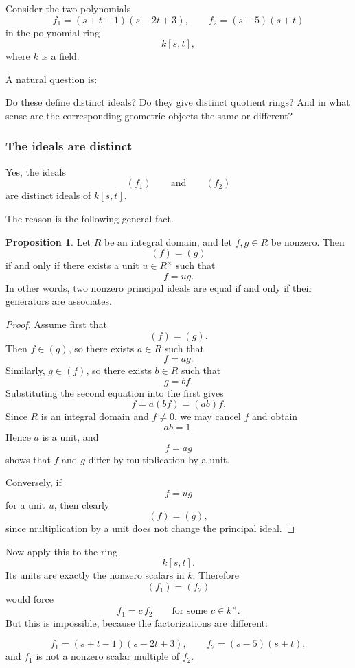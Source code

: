 \documentclass[12pt,a4paper]{article}
\theoremstyle{notespace}
\theoremstyle{definition}
\newtheorem{proposition}[definition]{Proposition}
\begin{document}
Consider the two polynomials
\[
f_1=(s+t-1)(s-2t+3),
\qquad
f_2=(s-5)(s+t)
\]
in the polynomial ring
\[
k[s,t],
\]
where \(k\) is a field.

A natural question is:

\medskip

Do these define distinct ideals?
Do they give distinct quotient rings?
And in what sense are the corresponding geometric objects the same or different?

\subsubsection{The ideals are distinct}

Yes, the ideals
\[
(f_1)
\qquad\text{and}\qquad
(f_2)
\]
are distinct ideals of \(k[s,t]\).

The reason is the following general fact.

\begin{proposition}
	Let \(R\) be an integral domain, and let \(f,g\in R\) be nonzero. Then
	\[
	(f)=(g)
	\]
	if and only if there exists a unit \(u\in R^\times\) such that
	\[
	f=ug.
	\]
	In other words, two nonzero principal ideals are equal if and only if their generators are associates.
\end{proposition}

\begin{proof}
	Assume first that
	\[
	(f)=(g).
	\]
	Then \(f\in (g)\), so there exists \(a\in R\) such that
	\[
	f=ag.
	\]
	Similarly, \(g\in (f)\), so there exists \(b\in R\) such that
	\[
	g=bf.
	\]
	Substituting the second equation into the first gives
	\[
	f=a(bf)=(ab)f.
	\]
	Since \(R\) is an integral domain and \(f\neq 0\), we may cancel \(f\) and obtain
	\[
	ab=1.
	\]
	Hence \(a\) is a unit, and
	\[
	f=ag
	\]
	shows that \(f\) and \(g\) differ by multiplication by a unit.
	
	Conversely, if
	\[
	f=ug
	\]
	for a unit \(u\), then clearly
	\[
	(f)=(g),
	\]
	since multiplication by a unit does not change the principal ideal.
\end{proof}

Now apply this to the ring
\[
k[s,t].
\]
Its units are exactly the nonzero scalars in \(k\). Therefore
\[
(f_1)=(f_2)
\]
would force
\[
f_1=c\,f_2
\qquad\text{for some } c\in k^\times.
\]
But this is impossible, because the factorizations are different:

\[
f_1=(s+t-1)(s-2t+3),
\qquad
f_2=(s-5)(s+t),
\]
and \(f_1\) is not a nonzero scalar multiple of \(f_2\).
\end{document}
